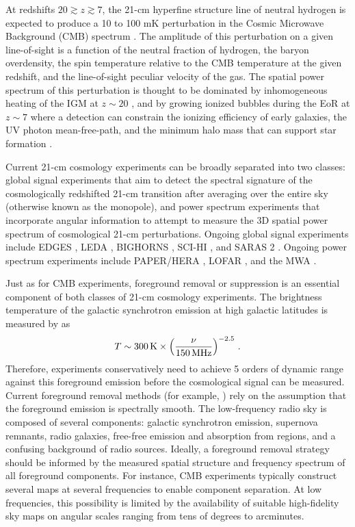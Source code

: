 \documentclass[twocolumn]{aastex61}
\begin{document}
At redshifts $20 \gtrsim z \gtrsim 7$, the 21-cm hyperfine structure line of neutral hydrogen is
expected to produce a 10 to 100 mK perturbation in the Cosmic Microwave Background (CMB) spectrum
\citep{2006PhR...433..181F, 2012RPPh...75h6901P}. The amplitude of this perturbation on a given
line-of-sight is a function of the neutral fraction of hydrogen, the baryon overdensity, the spin
temperature relative to the CMB temperature at the given redshift, and the line-of-sight peculiar
velocity of the gas.  The spatial power spectrum of this perturbation is thought to be dominated by
inhomogeneous heating of the IGM at $z\sim 20$ \citep{2014MNRAS.437L..36F}, and by growing ionized
bubbles during the EoR at $z\sim 7$ where a detection can constrain the ionizing efficiency of early
galaxies, the UV photon mean-free-path, and the minimum halo mass that can support star formation
\citep{2015MNRAS.449.4246G}.

Current 21-cm cosmology experiments can be broadly separated into two classes: global signal
experiments that aim to detect the spectral signature of the cosmologically redshifted 21-cm
transition after averaging over the entire sky (otherwise known as the monopole), and power spectrum
experiments that incorporate angular information to attempt to measure the 3D spatial power spectrum
of cosmological 21-cm perturbations.  Ongoing global signal experiments include EDGES
\citep{2010Natur.468..796B, 2017ApJ...847...64M}, LEDA \citep{2017arXiv170909313P}, BIGHORNS
\citep{2015PASA...32....4S}, SCI-HI \citep{2014ApJ...782L...9V}, and SARAS 2
\citep{2017arXiv170306647S}.  Ongoing power spectrum experiments include PAPER/HERA
\citep{2015ApJ...809...61A, 2016arXiv160607473D}, LOFAR \citep{2017ApJ...838...65P}, and the MWA
\citep{2016ApJ...833..102B, 2016MNRAS.460.4320E}.

Just as for CMB experiments, foreground removal or suppression is an essential component of both
classes of 21-cm cosmology experiments. The brightness temperature of the galactic synchrotron
emission at high galactic latitudes is measured by \citet{2008AJ....136..641R} as
\begin{equation}
    T \sim 300\,{\rm K} \times \left(\frac{\nu}{150\,{\rm MHz}}\right)^{-2.5}\,.
\end{equation}
Therefore, experiments conservatively need to achieve 5 orders of dynamic range against this
foreground emission before the cosmological signal can be measured. Current foreground removal
methods (for example, \citealt{2012ApJ...756..165P}) rely on the assumption that the foreground
emission is spectrally smooth. The low-frequency radio sky is composed of several components:
galactic synchrotron emission, supernova remnants, radio galaxies, free-free emission and absorption
from  regions, and a confusing background of radio sources.  Ideally, a foreground removal
strategy should be informed by the measured spatial structure and frequency spectrum of all
foreground components. For instance, CMB experiments typically construct several maps at several
frequencies to enable component separation.  At low frequencies, this possibility is limited by the
availability of suitable high-fidelity sky maps on angular scales ranging from tens of degrees to
arcminutes.
\end{document}
